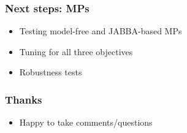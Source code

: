 \documentclass{beamer}
\begin{document}
\begin{frame}
    \frametitle{Next steps: MPs}
\begin{itemize}
    \item Testing model-free and JABBA-based MPs
    \item Tuning for all three objectives
    \item Robustness tests
\end{itemize}
\end{frame}

\begin{frame}
    \frametitle{Thanks}
\begin{itemize}
    \item Happy to take comments/questions
\end{itemize}
\end{frame}

\end{document}
